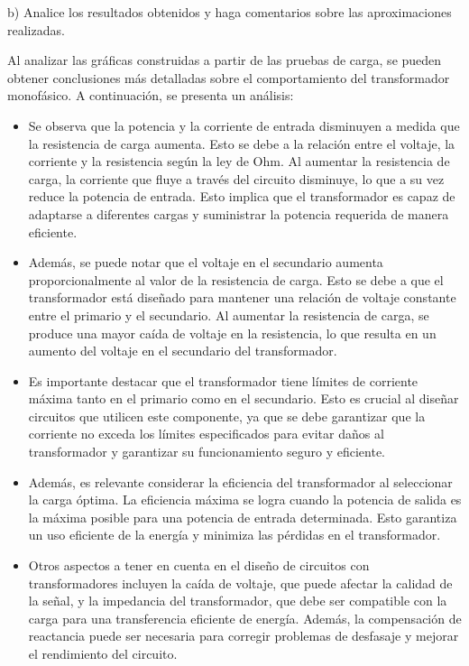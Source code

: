 \documentclass[12pt]{article}
\begin{document}
	b) Analice los resultados obtenidos y haga comentarios sobre las aproximaciones realizadas.
	
	Al analizar las gráficas construidas a partir de las pruebas de carga, se pueden obtener conclusiones más detalladas sobre el comportamiento del transformador monofásico. A continuación, se presenta un análisis:\\
	
	\begin{itemize}
		\item Se observa que la potencia y la corriente de entrada disminuyen a medida que la resistencia de carga aumenta. Esto se debe a la relación entre el voltaje, la corriente y la resistencia según la ley de Ohm. Al aumentar la resistencia de carga, la corriente que fluye a través del circuito disminuye, lo que a su vez reduce la potencia de entrada. Esto implica que el transformador es capaz de adaptarse a diferentes cargas y suministrar la potencia requerida de manera eficiente.
		
		\item Además, se puede notar que el voltaje en el secundario aumenta proporcionalmente al valor de la resistencia de carga. Esto se debe a que el transformador está diseñado para mantener una relación de voltaje constante entre el primario y el secundario. Al aumentar la resistencia de carga, se produce una mayor caída de voltaje en la resistencia, lo que resulta en un aumento del voltaje en el secundario del transformador.
		
		\item Es importante destacar que el transformador tiene límites de corriente máxima tanto en el primario como en el secundario. Esto es crucial al diseñar circuitos que utilicen este componente, ya que se debe garantizar que la corriente no exceda los límites especificados para evitar daños al transformador y garantizar su funcionamiento seguro y eficiente.
		
		\item Además, es relevante considerar la eficiencia del transformador al seleccionar la carga óptima. La eficiencia máxima se logra cuando la potencia de salida es la máxima posible para una potencia de entrada determinada. Esto garantiza un uso eficiente de la energía y minimiza las pérdidas en el transformador.
		
		\item Otros aspectos a tener en cuenta en el diseño de circuitos con transformadores incluyen la caída de voltaje, que puede afectar la calidad de la señal, y la impedancia del transformador, que debe ser compatible con la carga para una transferencia eficiente de energía. Además, la compensación de reactancia puede ser necesaria para corregir problemas de desfasaje y mejorar el rendimiento del circuito.
	\end{itemize}
	
\end{document}
